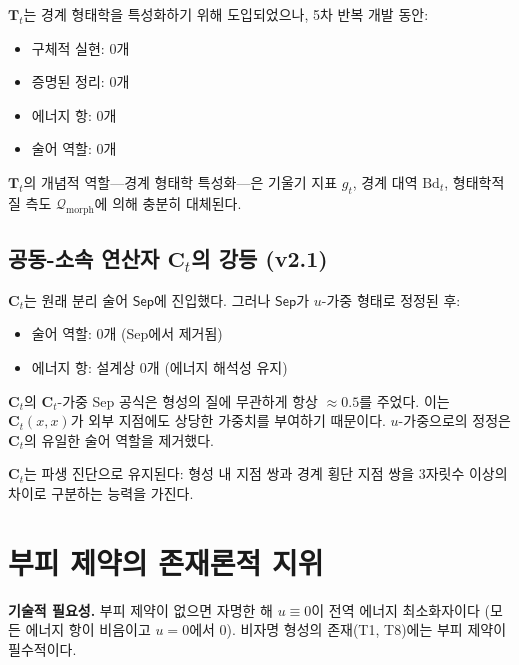 $\mathbf{T}_t$는 경계 형태학을 특성화하기 위해 도입되었으나, 5차 반복 개발 동안:
\begin{itemize}
    \item 구체적 실현: 0개
    \item 증명된 정리: 0개
    \item 에너지 항: 0개
    \item 술어 역할: 0개
\end{itemize}

$\mathbf{T}_t$의 개념적 역할---경계 형태학 특성화---은 기울기 지표 $g_t$, 경계 대역 $\mathrm{Bd}_t$, 형태학적 질 측도 $\mathcal{Q}_{\mathrm{morph}}$에 의해 충분히 대체된다.

\subsection{공동-소속 연산자 $\mathbf{C}_t$의 강등 (v2.1)}

$\mathbf{C}_t$는 원래 분리 술어 $\mathsf{Sep}$에 진입했다. 그러나 $\mathsf{Sep}$가 $u$-가중 형태로 정정된 후:
\begin{itemize}
    \item 술어 역할: 0개 (Sep에서 제거됨)
    \item 에너지 항: 설계상 0개 (에너지 해석성 유지)
\end{itemize}

$\mathbf{C}_t$의 $\mathbf{C}_t$-가중 Sep 공식은 형성의 질에 무관하게 항상 $\approx 0.5$를 주었다. 이는 $\mathbf{C}_t(x,x)$가 외부 지점에도 상당한 가중치를 부여하기 때문이다. $u$-가중으로의 정정은 $\mathbf{C}_t$의 유일한 술어 역할을 제거했다.

$\mathbf{C}_t$는 파생 진단으로 유지된다: 형성 내 지점 쌍과 경계 횡단 지점 쌍을 3자릿수 이상의 차이로 구분하는 능력을 가진다.


\section{부피 제약의 존재론적 지위}
\label{app:cn-volume}

\begin{center}
\end{center}

\textbf{기술적 필요성.} 부피 제약이 없으면 자명한 해 $u \equiv 0$이 전역 에너지 최소화자이다 (모든 에너지 항이 비음이고 $u = 0$에서 0). 비자명 형성의 존재(T1, T8)에는 부피 제약이 필수적이다.

